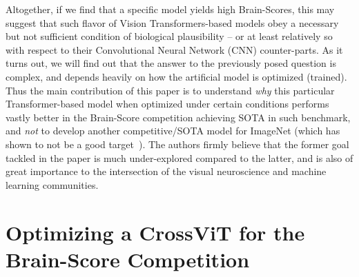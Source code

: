\documentclass{article} %
\newcommand{\arturo}{\textcolor{violet}}
\begin{document}
Altogether, if we find that a specific model yields high Brain-Scores, this may suggest that such flavor of Vision Transformers-based models obey a necessary but not sufficient condition of biological plausibility -- or at least relatively so with respect to their Convolutional Neural Network (CNN) counter-parts. As it turns out, we will find out that the answer to the previously posed question is complex, and depends heavily on how the artificial model is optimized (trained).
Thus the main contribution of this paper is to understand \textit{why} this particular Transformer-based model when optimized under certain conditions performs vastly better in the Brain-Score competition achieving SOTA in such benchmark, and \textit{not} to develop another competitive/SOTA model for ImageNet (which has shown to not be a good target~\cite{beyer2020we}). The authors firmly believe that the former goal tackled in the paper is much under-explored compared to the latter, and is also of great importance to the intersection of the visual neuroscience and machine learning communities.


\section{Optimizing a CrossViT for the Brain-Score Competition}

\end{document}
